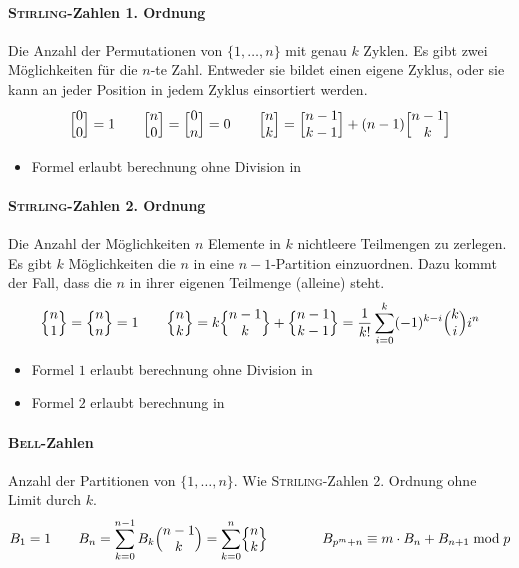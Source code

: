 \paragraph{\textsc{Stirling}-Zahlen 1. Ordnung}
Die Anzahl der Permutationen von $\{1, \ldots, n\}$ mit genau $k$ Zyklen.
Es gibt zwei Möglichkeiten für die $n$-te Zahl. Entweder sie bildet einen eigene Zyklus, oder sie kann an jeder Position in jedem Zyklus einsortiert werden.
\[\Bigl[ \begin{matrix} 0 \\ 0 \end{matrix} \Bigr] = 1 \qquad
\Bigl[ \begin{matrix} n \\ 0 \end{matrix} \Bigr] = \Bigl[ \begin{matrix} 0 \\ n \end{matrix} \Bigr] = 0 \qquad
\Bigl[ \begin{matrix} n \\ k \end{matrix} \Bigr] = \Bigl[ \begin{matrix} n-1 \\ k-1 \end{matrix} \Bigr] + (n-1) \Bigl[ \begin{matrix} n-1 \\ k \end{matrix} \Bigr]\]
\begin{itemize}
	\item Formel erlaubt berechnung ohne Division in 
\end{itemize}

\paragraph{\textsc{Stirling}-Zahlen 2. Ordnung}
Die Anzahl der Möglichkeiten $n$ Elemente in $k$ nichtleere Teilmengen zu zerlegen.
Es gibt $k$ Möglichkeiten die $n$ in eine $n-1$-Partition einzuordnen.
Dazu kommt der Fall, dass die $n$ in ihrer eigenen Teilmenge (alleine) steht.
\[\Bigl\{ \begin{matrix} n \\ 1 \end{matrix} \Bigr\} = \Bigl\{ \begin{matrix} n \\ n \end{matrix} \Bigr\} = 1 \qquad
\Bigl\{ \begin{matrix} n \\ k \end{matrix} \Bigr\} = k \Bigl\{ \begin{matrix} n-1 \\ k \end{matrix} \Bigr\} + \Bigl\{ \begin{matrix} n-1 \\ k-1 \end{matrix} \Bigr\} =
\frac{1}{k!} \sum\limits_{i=0}^{k} (-1)^{k-i}\Bigl( \begin{matrix} k \\ i \end{matrix} \Bigr)i^n\]
\begin{itemize}
	\item Formel $1$ erlaubt berechnung ohne Division in 
	\item Formel $2$ erlaubt berechnung in 
\end{itemize}

\paragraph{\textsc{Bell}-Zahlen}
Anzahl der Partitionen von $\{1, \ldots, n\}$.
Wie \textsc{Striling}-Zahlen 2. Ordnung ohne Limit durch $k$.
\[B_1 = 1 \qquad
B_n = \sum\limits_{k = 0}^{n - 1} B_k\Bigl( \begin{matrix} n-1 \\ k \end{matrix} \Bigr)
= \sum\limits_{k = 0}^{n}\Bigl\{ \begin{matrix} n \\ k \end{matrix} \Bigr\}\qquad\qquad B_{p^m+n}\equiv m\cdot B_n + B_{n+1} \bmod{p}\]

